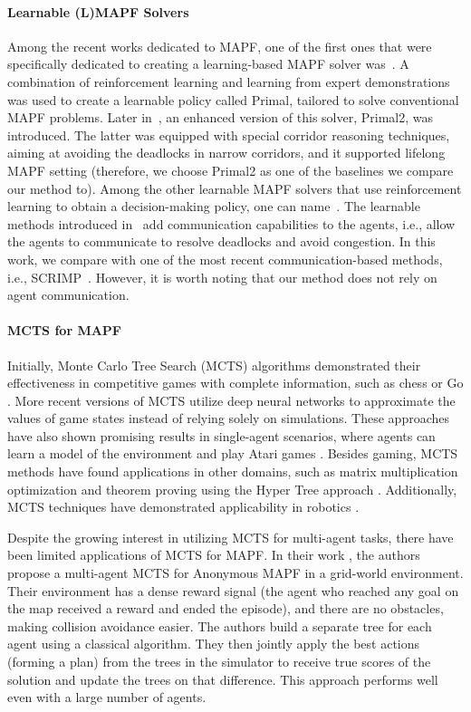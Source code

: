 \documentclass[letterpaper]{article} %
\begin{document}
\paragraph{Learnable (L)MAPF Solvers} Among the recent works dedicated to MAPF, one of the first ones that were specifically dedicated to creating a learning-based MAPF solver was~\cite{sartoretti2019primal}. A combination of reinforcement learning and learning from expert demonstrations was used to create a learnable policy called Primal, tailored to solve conventional MAPF problems. Later in~\cite{damani2021primal}, an enhanced version of this solver, Primal2, was introduced. The latter was equipped with special corridor reasoning techniques, aiming at avoiding the deadlocks in narrow corridors, and it supported lifelong MAPF setting (therefore, we choose Primal2 as one of the baselines we compare our method to). Among the other learnable MAPF solvers that use reinforcement learning to obtain a decision-making policy, one can name~\cite{riviere2020glas,Wang2020}. The learnable methods introduced in~\cite{li2020graph,ma2021distributed,Li2022MultiAgentPF} add communication capabilities to the agents, i.e., allow the agents to communicate to resolve deadlocks and avoid congestion. In this work, we compare with one of the most recent communication-based methods, i.e., SCRIMP~\cite{wang_scrimp_2023}. However, it is worth noting that our method does not rely on agent communication.

\paragraph{MCTS for MAPF}
Initially, Monte Carlo Tree Search (MCTS) algorithms demonstrated their effectiveness in competitive games with complete information, such as chess or Go \cite{silver2017mastering}. More recent versions of MCTS utilize deep neural networks to approximate the values of game states instead of relying solely on simulations. These approaches have also shown promising results in single-agent scenarios, where agents can learn a model of the environment and play Atari games \cite{schrittwieser2020mastering, ye2021mastering}. Besides gaming, MCTS methods have found applications in other domains, such as matrix multiplication optimization \cite{fawzi2022discovering} and theorem proving using the Hyper Tree approach \cite{lample2022hypertree}. Additionally, MCTS techniques have demonstrated applicability in robotics \cite{best2019dec, dam2022monte}.

Despite the growing interest in utilizing MCTS for multi-agent tasks, there have been limited applications of MCTS for MAPF. In their work \cite{zerbel2019multiagent}, the authors propose a multi-agent MCTS for Anonymous MAPF in a grid-world environment. Their environment has a dense reward signal (the agent who reached any goal on the map received a reward and ended the episode), and there are no obstacles, making collision avoidance easier. The authors build a separate tree for each agent using a classical algorithm. They then jointly apply the best actions (forming a plan) from the trees in the simulator to receive true scores of the solution and update the trees on that difference. This approach performs well even with a large number of agents.
\end{document}
